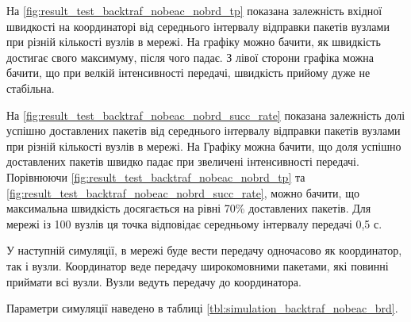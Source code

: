 \documentclass[a4paper,ukrainian,utf8,nocolumnsxix,floatsection,equationsection]{eskdtext}
\begin{document}
На \cref{fig:result_test_backtraf_nobeac_nobrd_tp} показана залежність вхідної швидкості на координаторі від середнього інтервалу відправки пакетів вузлами при різній кількості вузлів в мережі. На графіку можно бачити, як швидкість достигає свого максимуму, після чого падає. З лівої сторони графіка можна бачити, що при велкій інтенсивності передачі, швидкість прийому дуже не стабільна.

На \cref{fig:result_test_backtraf_nobeac_nobrd_succ_rate} показана залежність долі успішно доставлених пакетів від середнього інтервалу відправки пакетів вузлами при різній кількості вузлів в мережі. На Графіку можна бачити, що доля успішно доставлених пакетів швидко падає при звеличені інтенсивності передачі. Порівнюючи \cref{fig:result_test_backtraf_nobeac_nobrd_tp} та \cref{fig:result_test_backtraf_nobeac_nobrd_succ_rate}, можно бачити, що максимальна швидкість досягається на рівні 70\% доставлених пакетів. Для мережі із 100 вузлів ця точка відповідає середньому інтервалу передачі 0,5 с.

У наступній симуляції, в мережі буде вести передачу одночасово як координатор, так і вузли. Координатор веде передачу широкомовними пакетами, які повинні приймати всі вузли. Вузли ведуть передачу до координатора.

Параметри симуляції наведено в таблиці \ref{tbl:simulation_backtraf_nobeac_brd}.
\end{document}
